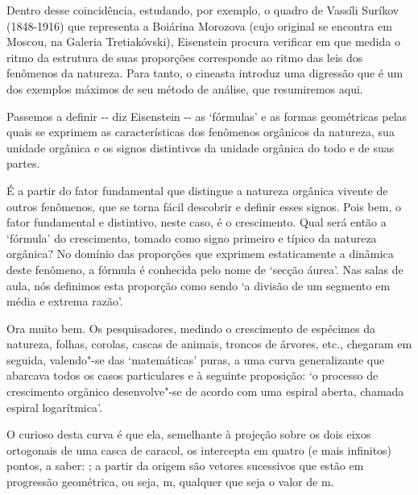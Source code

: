 Dentro desse coincidência, estudando, por exemplo, o quadro de Vassíli
Suríkov (1848-1916) que representa a Boiárina Morozova (cujo original se
encontra em Moscou, na Galeria Tretiakóvski), Eisenstein procura
verificar em que medida o ritmo da estrutura de suas proporções
corresponde ao ritmo das leis dos fenômenos da natureza. Para tanto, o
cineasta introduz uma digressão que é um dos exemplos máximos de seu
método de análise, que resumiremos aqui.

Passemos a definir -\/- diz Eisenstein -\/- as `fórmulas' e as formas
geométricas pelas quais se exprimem as características dos fenômenos
orgânicos da natureza, sua unidade orgânica e os signos distintivos da
unidade orgânica do todo e de suas partes.

É a partir do fator fundamental que distingue a natureza orgânica
vivente de outros fenômenos, que se torna fácil descobrir e definir
esses signos. Pois bem, o fator fundamental e distintivo, neste caso, é
o crescimento. Qual será então a `fórmula' do crescimento, tomado como
signo primeiro e típico da natureza orgânica? No domínio das proporções
que exprimem estaticamente a dinâmica deste fenômeno, a fórmula é
conhecida pelo nome de `secção áurea'. Nas salas de aula, nós definimos
esta proporção como sendo `a divisão de um segmento em média e extrema
razão'.

Ora muito bem. Os pesquisadores, medindo o crescimento de espécimes da
natureza, folhas, corolas, cascas de animais, troncos de árvores, etc.,
chegaram em seguida, valendo"-se das `matemáticas' puras, a uma curva
generalizante que abarcava todos os casos particulares e à seguinte
proposição: `o processo de crescimento orgânico desenvolve"-se de acordo
com uma espiral aberta, chamada espiral logarítmica'.


O curioso desta curva é que ela, semelhante à projeção sobre os dois
eixos ortogonais de uma casca de caracol, os intercepta em quatro (e
mais infinitos) pontos, a saber: ; a partir da origem  são
vetores sucessivos que estão em progressão geométrica, ou seja,
m, qualquer que seja o valor de {m}.

